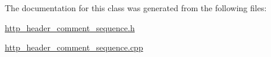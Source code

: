 The documentation for this class was generated from the following files\-:\begin{DoxyCompactItemize}
\item 
\hyperlink{http__header__comment__sequence_8h}{http\-\_\-header\-\_\-comment\-\_\-sequence.\-h}\item 
\hyperlink{http__header__comment__sequence_8cpp}{http\-\_\-header\-\_\-comment\-\_\-sequence.\-cpp}\end{DoxyCompactItemize}
